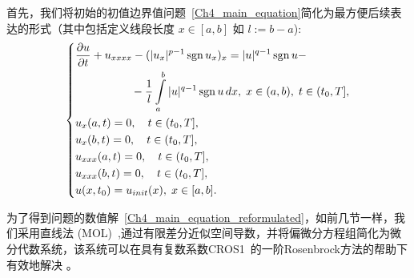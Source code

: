 \documentclass[twoside]{book}
\DeclareMathOperator{\sign}{sgn}
\begin{document}
\begin{CJK*}{GBK}{song}
首先，我们将初始的初值边界值问题~\eqref{Ch4_main_equation}简化为最方便后续表达的形式（其中包括定义线段长度 $x \in [a,b]$ 如 $l := b - a$):
\begin{equation}
\label{Ch4_main_equation_reformulated}
\left\{
\begin{aligned}
&\dfrac{\partial u}{\partial t} + u_{xxxx} - (|u_x|^{p - 1} \sign u_x )_x = |u|^{q - 1} \sign u - \\
&\hspace{+1.75cm} - \dfrac{1}{l} \int\limits_a^b |u|^{q - 1} \sign u \, dx, \; x \in (a,b), \; t \in (t_0,T], \\
&u_{x}(a,t) = 0, \quad t \in (t_0,T], \\
&u_{x}(b,t) = 0, \quad t \in (t_0,T], \\
&u_{xxx}(a,t) = 0, \quad t \in (t_0,T], \\
&u_{xxx}(b,t) = 0, \quad t \in (t_0,T], \\
&u(x,t_0) = u_{init}(x), \; x \in [a,b].
\end{aligned}
\right.
\end{equation}

为了得到问题的数值解~\eqref{Ch4_main_equation_reformulated}，如前几节一样，我们采用直线法 (MOL)~\cite{Kalitkin&Ko_1,Kalitkin,Hairer&Wanner},通过有限差分近似空间导数，并将偏微分方程组简化为微分代数系统，该系统可以在具有复数系数CROS1~\cite{Kalitkin&Ko_1,Rosenbrock}的一阶Rosenbrock方法的帮助下有效地解决 。


\end{CJK*}
\end{document}
